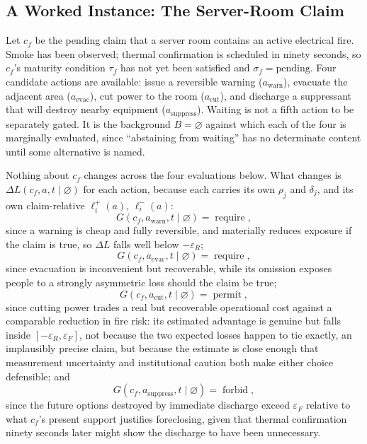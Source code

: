 \documentclass[11pt]{article}
\begin{document}
\subsection{A Worked Instance: The Server-Room Claim}

Let $c_f$ be the pending claim that a server room contains an active electrical fire. Smoke has been observed; thermal confirmation is scheduled in ninety seconds, so $c_f$'s maturity condition $\tau_f$ has not yet been satisfied and $\sigma_f = \text{pending}$. Four candidate actions are available: issue a reversible warning ($a_{\mathrm{warn}}$), evacuate the adjacent area ($a_{\mathrm{evac}}$), cut power to the room ($a_{\mathrm{cut}}$), and discharge a suppressant that will destroy nearby equipment ($a_{\mathrm{suppress}}$). Waiting is not a fifth action to be separately gated. It is the background $B = \varnothing$ against which each of the four is marginally evaluated, since ``abstaining from waiting'' has no determinate content until some alternative is named.

Nothing about $c_f$ changes across the four evaluations below. What changes is $\Delta L(c_f, a, t \mid \varnothing)$ for each action, because each carries its own $\rho_j$ and $\delta_j$, and its own claim-relative $\ell_i^{+}(a)$, $\ell_i^{-}(a)$:
\[
G(c_f, a_{\mathrm{warn}}, t \mid \varnothing) = \operatorname{require},
\]
since a warning is cheap and fully reversible, and materially reduces exposure if the claim is true, so $\Delta L$ falls well below $-\varepsilon_R$;
\[
G(c_f, a_{\mathrm{evac}}, t \mid \varnothing) = \operatorname{require},
\]
since evacuation is inconvenient but recoverable, while its omission exposes people to a strongly asymmetric loss should the claim be true;
\[
G(c_f, a_{\mathrm{cut}}, t \mid \varnothing) = \operatorname{permit},
\]
since cutting power trades a real but recoverable operational cost against a comparable reduction in fire risk: its estimated advantage is genuine but falls inside $[-\varepsilon_R, \varepsilon_F]$, not because the two expected losses happen to tie exactly, an implausibly precise claim, but because the estimate is close enough that measurement uncertainty and institutional caution both make either choice defensible; and
\[
G(c_f, a_{\mathrm{suppress}}, t \mid \varnothing) = \operatorname{forbid},
\]
since the future options destroyed by immediate discharge exceed $\varepsilon_F$ relative to what $c_f$'s present support justifies foreclosing, given that thermal confirmation ninety seconds later might show the discharge to have been unnecessary.
\end{document}
